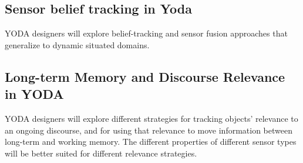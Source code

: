 \documentclass[10pt]{article}
\begin{document}
\subsection {Sensor belief tracking in Yoda}
YODA designers will explore belief-tracking and sensor fusion approaches that generalize to dynamic situated domains.

\subsection {Long-term Memory and Discourse Relevance in YODA}
YODA designers will explore different strategies for tracking objects' relevance to an ongoing discourse, and for using that relevance to move information between long-term and working memory.
The different properties of different sensor types will be better suited for different relevance strategies.



\end{document}

